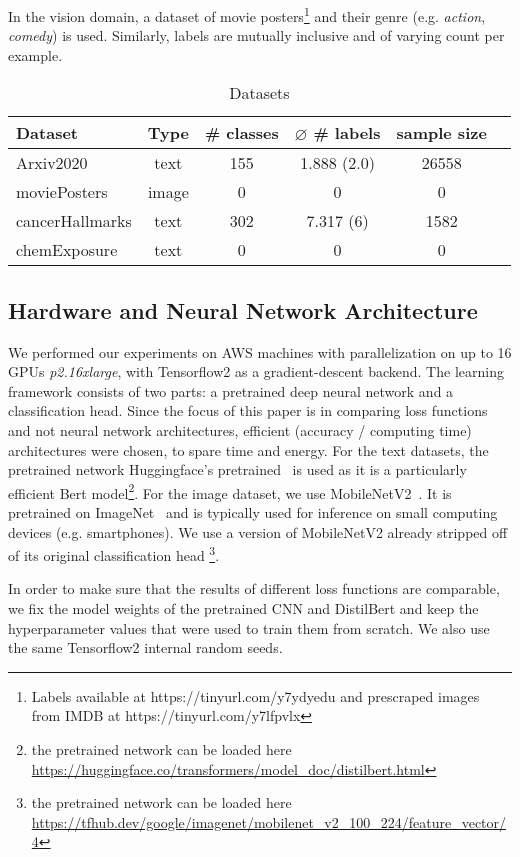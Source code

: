 In the vision domain, a dataset of movie posters\footnote{Labels available at https://tinyurl.com/y7ydyedu and prescraped images from IMDB at https://tinyurl.com/y7lfpvlx} and their genre (e.g. \emph{action}, \emph{comedy}) is used. Similarly, labels are mutually inclusive and of varying count per example. 

\begin{table}
\caption{Datasets}
\label{tab:arxiv2020}
\centering
\begin{tabular}{l ccccc}
\toprule
Dataset & Type & \# classes & $\varnothing$ \# labels & sample size\\
\midrule
Arxiv2020 & text & 155 & 1.888 (2.0) & 26558\\ 
moviePosters & image & 0 & 0 & 0\\
cancerHallmarks & text & 302 & 7.317 (6) & 1582\\
chemExposure & text & 0 & 0 & 0\\
\bottomrule
\end{tabular}
\end{table}

\subsection{Hardware and Neural Network Architecture}

We performed our experiments on AWS machines with parallelization on up to 16 GPUs \textit{p2.16xlarge}, with Tensorflow2 as a gradient-descent backend. The learning framework consists of two parts: a pretrained deep neural network and a classification head. Since the focus of this paper is in comparing loss functions and not neural network architectures, efficient  (accuracy / computing time) architectures were chosen, to spare time and energy.
For the text datasets, the pretrained network Huggingface's pretrained~\cite{distilBert} is used as it is a particularly efficient Bert model\footnote{the pretrained network can be loaded here \url{https://huggingface.co/transformers/model_doc/distilbert.html}}. For the image dataset, we use MobileNetV2~\cite{mobileNet}. It is pretrained on ImageNet~\cite{imagenet} and is typically used for inference on small computing devices (e.g. smartphones). We use a version of MobileNetV2 already stripped off of its original classification head  \footnote{the pretrained network can be loaded here \url{https://tfhub.dev/google/imagenet/mobilenet_v2_100_224/feature_vector/4}}.

In order to make sure that the results of different loss functions are comparable, we fix the model weights of the pretrained CNN and DistilBert and keep the hyperparameter values that were used to train them from scratch. We also use the same Tensorflow2 internal random seeds.

